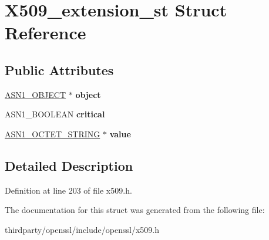 \hypertarget{struct_x509__extension__st}{}\section{X509\+\_\+extension\+\_\+st Struct Reference}
\label{struct_x509__extension__st}
\subsection*{Public Attributes}
\begin{DoxyCompactItemize}
\item 
\mbox{\label{struct_x509__extension__st_a8aea7d682ad5be95235abe897c0160fa}} 
\hyperlink{structasn1__object__st}{A\+S\+N1\+\_\+\+O\+B\+J\+E\+CT} $\ast$ {\bfseries object}
\item 
\mbox{\label{struct_x509__extension__st_a143f7da8b44e344f89faf5ffc657031b}} 
A\+S\+N1\+\_\+\+B\+O\+O\+L\+E\+AN {\bfseries critical}
\item 
\mbox{\label{struct_x509__extension__st_a670220c7ca6eef25dde30f43db492114}} 
\hyperlink{structasn1__string__st}{A\+S\+N1\+\_\+\+O\+C\+T\+E\+T\+\_\+\+S\+T\+R\+I\+NG} $\ast$ {\bfseries value}
\end{DoxyCompactItemize}


\subsection{Detailed Description}


Definition at line 203 of file x509.\+h.



The documentation for this struct was generated from the following file\+:\begin{DoxyCompactItemize}
\item 
thirdparty/openssl/include/openssl/x509.\+h\end{DoxyCompactItemize}
